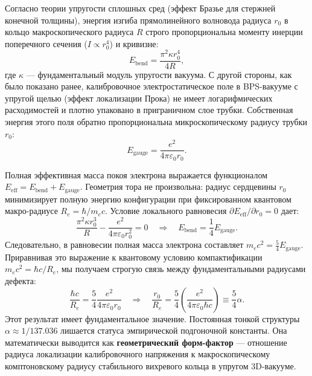 \documentclass[12pt,a4paper]{article}
\begin{document}
Согласно теории упругости сплошных сред (эффект Бразье для стержней конечной толщины), энергия изгиба прямолинейного волновода радиуса $r_0$ в кольцо макроскопического радиуса $R$ строго пропорциональна моменту инерции поперечного сечения ($I \propto r_0^4$) и кривизне:
\begin{equation}
	E_{\text{bend}} = \frac{\pi^2 \kappa r_0^4}{4R},
\end{equation}
где $\kappa$ — фундаментальный модуль упругости вакуума. 
С другой стороны, как было показано ранее, калибровочное электростатическое поле в BPS-вакууме с упругой щелью (эффект локализации Прока) не имеет логарифмических расходимостей и плотно упаковано в приграничном слое трубки. Собственная энергия этого поля обратно пропорциональна микроскопическому радиусу трубки $r_0$:
\begin{equation}
	E_{\text{gauge}} = \frac{e^2}{4\pi\varepsilon_0 r_0}.
\end{equation}

Полная эффективная масса покоя электрона выражается функционалом $E_{\text{eff}} = E_{\text{bend}} + E_{\text{gauge}}$. Геометрия тора не произвольна: радиус сердцевины $r_0$ минимизирует полную энергию конфигурации при фиксированном квантовом макро-радиусе $R_e = \hbar / m_e c$.
Условие локального равновесия $\partial E_{\text{eff}} / \partial r_0 = 0$ дает:
\begin{equation}
	\frac{\pi^2 \kappa r_0^3}{R} - \frac{e^2}{4\pi\varepsilon_0 r_0^2} = 0 \quad \Longrightarrow \quad E_{\text{bend}} = \frac{1}{4} E_{\text{gauge}}.
\end{equation}
Следовательно, в равновесии полная масса электрона составляет $m_e c^2 = \frac{5}{4} E_{\text{gauge}}$. Приравнивая это выражение к квантовому условию компактификации $m_e c^2 = \hbar c / R_e$, мы получаем строгую связь между фундаментальными радиусами дефекта:
\begin{equation}
	\frac{\hbar c}{R_e} = \frac{5}{4} \frac{e^2}{4\pi\varepsilon_0 r_0} \quad \Longrightarrow \quad \frac{r_0}{R_e} = \frac{5}{4} \left( \frac{e^2}{4\pi\varepsilon_0 \hbar c} \right) \equiv \frac{5}{4} \alpha.
\end{equation}
Этот результат имеет фундаментальное значение. Постоянная тонкой структуры $\alpha \approx 1/137.036$ лишается статуса эмпирической подгоночной константы. Она математически выводится как \textbf{геометрический форм-фактор} — отношение радиуса локализации калибровочного напряжения к макроскопическому комптоновскому радиусу стабильного вихревого кольца в упругом 3D-вакууме.
\end{document}
